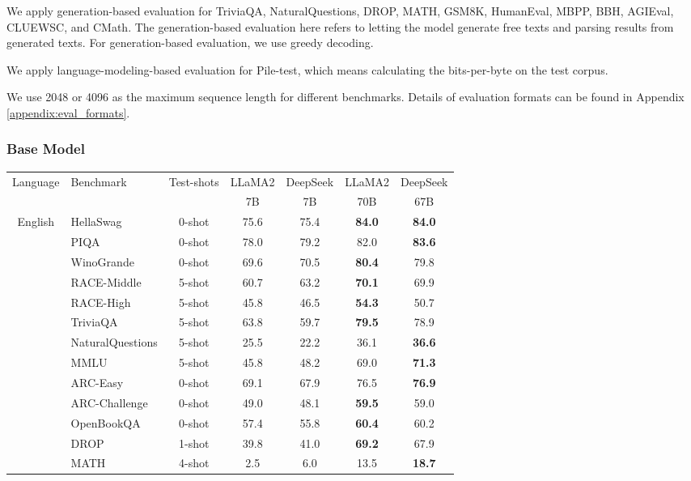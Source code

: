 \documentclass[11pt, a4paper, logo, copyright, nonumbering]{deepseek}
\begin{document}
\begin{CJK*}{UTF8}{gbsn}
We apply generation-based evaluation for TriviaQA, NaturalQuestions, DROP, MATH, GSM8K, HumanEval, MBPP, BBH, AGIEval, CLUEWSC, and CMath. The generation-based evaluation here refers to letting the model generate free texts and parsing results from generated texts. For generation-based evaluation, we use greedy decoding.

We apply language-modeling-based evaluation for Pile-test, which means calculating the bits-per-byte on the test corpus.

We use 2048 or 4096 as the maximum sequence length for different benchmarks. Details of evaluation formats can be found in Appendix \ref{appendix:eval_formats}.

\subsubsection{Base Model}
\begin{table}[!t]
    \centering
\begin{tabular}{clc|cccc}
\toprule
 \multirow{2}{*}{Language} & \multirow{2}{*}{\centering Benchmark} & \multirow{2}{*}{Test-shots} & LLaMA2 & DeepSeek & LLaMA2 & DeepSeek \\
 & & & 7B & 7B & 70B & 67B \\
\midrule
\multirow{19}{*}{English} & HellaSwag & 0-shot & 75.6 & 75.4 & \textbf{84.0} & \textbf{84.0} \\
&PIQA & 0-shot & 78.0 & 79.2 & 82.0 & \textbf{83.6} \\
&WinoGrande & 0-shot & 69.6 & 70.5 & \textbf{80.4} & 79.8 \\
&RACE-Middle & 5-shot & 60.7 & 63.2 & \textbf{70.1} & 69.9 \\
&RACE-High & 5-shot & 45.8 & 46.5 & \textbf{54.3} & 50.7 \\
&TriviaQA & 5-shot & 63.8 & 59.7 & \textbf{79.5} & 78.9 \\
&NaturalQuestions & 5-shot & 25.5 & 22.2 & 36.1 & \textbf{36.6} \\
&MMLU & 5-shot & 45.8 & 48.2 & 69.0 & \textbf{71.3} \\
&ARC-Easy & 0-shot & 69.1 & 67.9 & 76.5 & \textbf{76.9} \\
&ARC-Challenge & 0-shot & 49.0 & 48.1 & \textbf{59.5} & 59.0 \\
&OpenBookQA  & 0-shot & 57.4 & 55.8 & \textbf{60.4} & 60.2 \\
&DROP & 1-shot & 39.8 & 41.0 & \textbf{69.2} & 67.9 \\
&MATH & 4-shot & 2.5 & 6.0 & 13.5 & \textbf{18.7} \\

\end{tabular}
\end{table}
\end{CJK*}
\end{document}
